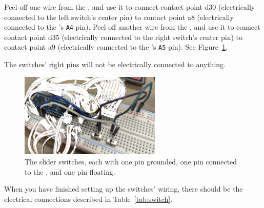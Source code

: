Peel off one wire from the \rainbow, and use it to connect contact point d30
(electrically connected to the left switch's center pin) to contact point a8
(electrically connected to the \nano's \texttt{A4} pin). Peel off another wire
from the \rainbow, and use it to connect contact point d35 (electrically
connected to the right switch's center pin) to contact point a9 (electrically
connected to the \nano's \texttt{A5} pin). %
See Figure~\ref{fig:switch-spst}.

The switches' right pins will not be electrically connected to anything.


\begin{figure}
    \centering
    \includegraphics[width=0.6\textwidth]{switch-spst}
    \caption{The slider switches, each with one pin grounded, one pin connected
        to the \nano, and one pin floating. \label{fig:switch-spst}}
\end{figure}

When you have finished setting up the switches' wiring, there should be the
electrical connections described in Table~\ref{tab:switch}.

